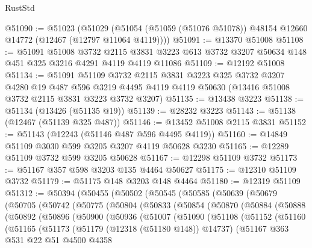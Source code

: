 \begin{lexlean}{RustStd}
\begin{coremodule}
@51090 := @51023
    (@51029 (@51054 (@51059 (@51076 @51078)) @48154 @12660 @14772 (@12467 (@12797 @11064 @4119))))
@51091 := @13370 @51008
@51108 := @51091
    @51008
    @3732
    @2115
    @3831
    @3223
    @613
    @3732
    @3207
    @50634
    @148
    @451
    @325
    @3216
    @4291
    @4119
    @4119
    @11086
@51109 := @12192 @51008
@51134 := @51091
    @51109
    @3732
    @2115
    @3831
    @3223
    @325
    @3732
    @3207
    @4280
    @19
    @487
    @596
    @3219
    @4495
    @4119
    @4119
    @50630
    (@13416 @51008 @3732 @2115 @3831 @3223 @3732 @3207)
@51135 := @13438 @3223
@51138 := @51134 (@13426 (@51135 @19))
@51139 := @28232 @3223
@51143 := @51138 (@12467 (@51139 @325 @487))
@51146 := @13452 @51008 @2115 @3831
@51152 := @51143 (@12243 (@51146 @487 @596 @4495 @4119))
@51160 := @14849 @51109 @3030 @599 @3205 @3207 @4119 @50628 @3230
@51165 := @12289 @51109 @3732 @599 @3205 @50628
@51167 := @12298 @51109 @3732
@51173 := @51167 @357 @598 @3203 @135 @4464 @50627
@51175 := @12310 @51109 @3732
@51179 := @51175 @148 @3203 @148 @4464
@51180 := @12319 @51109
@51312 := @50394
    (@50455
      (@50502
        (@50545
          (@50585
            (@50639
              (@50679
                (@50705
                  (@50742
                    (@50775
                      (@50804
                        (@50833
                          (@50854
                            (@50870
                              (@50884
                                (@50888
                                  (@50892
                                    (@50896
                                      (@50900
                                        (@50936
                                          (@51007
                                            (@51090
                                              (@51108
                                                (@51152
                                                  (@51160
                                                    (@51165
                                                      (@51173
                                                        (@51179 (@12318 (@51180 @148)) @14737)
                                                        (@51167
                                                          @363
                                                          @531
                                                          @22
                                                          @51
                                                          @4500
                                                          @4358

\end{coremodule}
\end{lexlean}
